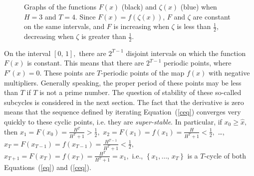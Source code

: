 \documentclass[12pt,a4paper]{amsart}
\begin{document}
\begin{figure}[h!]
\caption{Graphs of the functions $F(x)$ (black) and $\zeta (x)$ (blue) when $H=3$ and $T=4$.  Since $F(x) = f(\zeta(x))$, $F$ and $\zeta$ are constant on the same intervals, and $F$ is increasing when $\zeta$ is less than $\frac12$, decreasing when $\zeta$ is greater than $\frac12$. } \label{f13}
\end{figure}

On the interval $[0,\,1],$ there are $2^{T-1}$ disjoint intervals on which the function $F(x)$ is constant. This means that there are $2^{T-1}$ 
periodic points, where $F'(x)=0.$ These points are $T$-periodic points of the map $f(x)$ with negative multipliers. Generally speaking, 
the proper period of these points may be less than $T$ if $T$ is not a prime number. The question of stability of these so-called subcycles 
is considered in the next section. The fact that the derivative is zero means that the sequence defined by iterating Equation~(\ref{ceq}) 
 converges very quickly to these cyclic points, i.e. they are {\it super-stable}.   In particular, if $x_0 \geq \hat{x},$ then $x_1 = F(x_0) = \frac{H^T}{H^T + 1} > \frac12,$
$x_2 = F(x_1) = f(x_1) = \frac{H}{H^T + 1} < \frac12,$ \ldots , $x_T = F(x_{T-1}) = f(x_{T-1}) = \frac{H^{T-1}}{H^T + 1} < \frac12,$
$x_{T+1} = F(x_T) = f(x_T) = \frac{H^T}{H^T + 1} = x_1,$ i.e., $\left\{ x_1,\ldots,\,x_T\right\}$ is a $T$-cycle of both Equations~(\ref{eq}) and 
(\ref{ceq}). 
\end{document}

